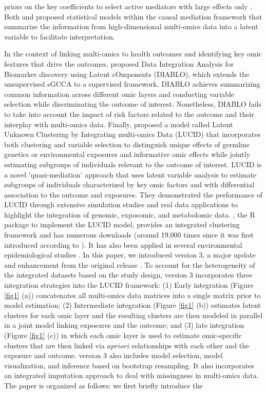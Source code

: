 priors on the key coefficients to select active mediators with large effects only \citep{song2020bayesian}. Both \citet{albert2016causal} and \citet{derkach2019high} proposed statistical models within the causal mediation framework that summarize the information from high-dimensional multi-omics data into a latent variable to facilitate interpretation. 

In the context of linking multi-omics to health outcomes and identifying key omic features that drive the outcomes, \citet{singh2019diablo} proposed Data Integration Analysis for Biomarker discovery using Latent cOmponents (DIABLO), which extends the unsupervised sGCCA to a supervised framework. DIABLO achieves summarizing common information across different omic layers and conducting variable selection while discriminating the outcome of interest. Nonetheless, DIABLO fails to take into account the impact of risk factors related to the outcome and their interplay with multi-omics data. Finally, \citet{peng2020latent} proposed a model called Latent Unknown Clustering by Integrating multi-omics Data (LUCID) that incorporates both clustering and variable selection to distinguish unique effects of germline genetics or environmental exposures and informative omic effects while jointly estimating subgroups of individuals relevant to the outcome of interest. LUCID is a novel 'quasi-mediation' approach that uses latent variable analysis to estimate subgroups of individuals characterized by key omic factors and with differential association to the outcome and exposures. They demonstrated the performance of LUCID through extensive simulation studies and real data applications to highlight the integration of genomic, exposomic, and metabolomic data. , the R package to implement the LUCID model, provides an integrated clustering framework and has numerous downloads (around 19,000 times since it was first introduced according to  \citep{yu2022dlstats}). It has also been applied in several environmental epidemiological studies \citep{jin2020perfluoroalkyl, stratakis2020prenatal, matta2022associations}. In this paper, we introduced  version 3, a major update and enhancement from the original release \citep{LUCIDus}. To account for the heterogeneity of the integrated datasets based on the study design,  version 3 incorporates three integration strategies into the LUCID framework: (1) Early integration (Figure \ref{fig1} (a)) concatenates all multi-omics data matrices into a single matrix prior to model estimation; (2) Intermediate integration (Figure \ref{fig1} (b)) estimates latent clusters for each omic layer and the resulting clusters are then modeled in parallel in a joint model linking exposures and the outcome; and (3) late integration (Figure \ref{fig1} (c)) in which each omic layer is used to estimate omic-specific clusters that are then linked via $ a priori$ relationships with each other and the exposure and outcome.  version 3 also includes model selection, model visualization, and inference based on bootstrap resampling. It also incorporates an integrated imputation approach to deal with missingness in multi-omics data. The paper is organized as follows: we first briefly introduce the 